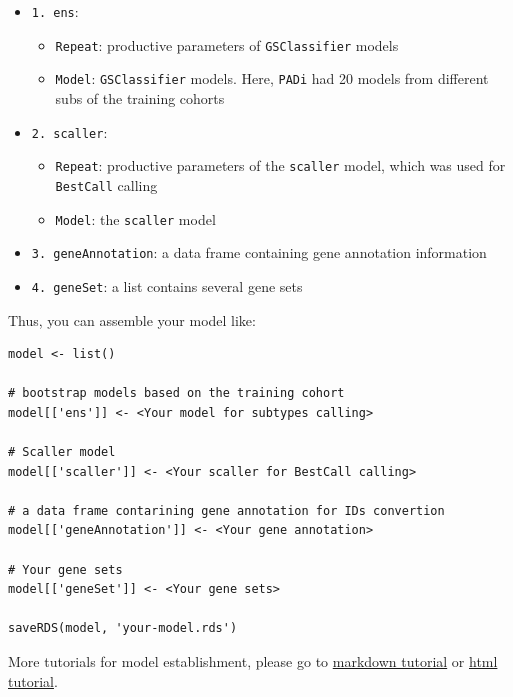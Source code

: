 \documentclass[
  12pt,
]{book}
\newcommand{\passthrough}[1]{#1}
\providecommand{\tightlist}{%
  \setlength{\itemsep}{0pt}\setlength{\parskip}{0pt}}
\begin{document}
\begin{itemize}
\tightlist
\item
  \passthrough{\lstinline!1. ens!}:

  \begin{itemize}
  \tightlist
  \item
    \passthrough{\lstinline!Repeat!}: productive parameters of \passthrough{\lstinline!GSClassifier!} models
  \item
    \passthrough{\lstinline!Model!}: \passthrough{\lstinline!GSClassifier!} models. Here, \passthrough{\lstinline!PADi!} had 20 models from different subs of the training cohorts
  \end{itemize}
\item
  \passthrough{\lstinline!2. scaller!}:

  \begin{itemize}
  \tightlist
  \item
    \passthrough{\lstinline!Repeat!}: productive parameters of the \passthrough{\lstinline!scaller!} model, which was used for \passthrough{\lstinline!BestCall!} calling
  \item
    \passthrough{\lstinline!Model!}: the \passthrough{\lstinline!scaller!} model
  \end{itemize}
\item
  \passthrough{\lstinline!3. geneAnnotation!}: a data frame containing gene annotation information
\item
  \passthrough{\lstinline!4. geneSet!}: a list contains several gene sets
\end{itemize}

Thus, you can assemble your model like:

\begin{lstlisting}
model <- list()

# bootstrap models based on the training cohort
model[['ens']] <- <Your model for subtypes calling>

# Scaller model
model[['scaller']] <- <Your scaller for BestCall calling>

# a data frame contarining gene annotation for IDs convertion
model[['geneAnnotation']] <- <Your gene annotation>

# Your gene sets
model[['geneSet']] <- <Your gene sets>

saveRDS(model, 'your-model.rds')
\end{lstlisting}

More tutorials for model establishment, please go to \href{https://github.com/huangwb8/GSClassifier/wiki/Model-establishment}{markdown tutorial} or \href{http://htmlpreview.github.io/?https://raw.githubusercontent.com/wiki/huangwb8/GSClassifier/Model-establishment.html}{html tutorial}.
\end{document}
